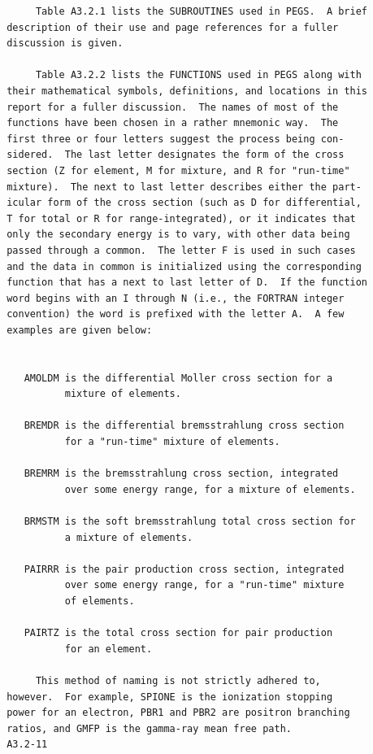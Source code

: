 \newpage {} \begin{verbatim}
      Table A3.2.1 lists the SUBROUTINES used in PEGS.  A brief
 description of their use and page references for a fuller
 discussion is given.
 
      Table A3.2.2 lists the FUNCTIONS used in PEGS along with
 their mathematical symbols, definitions, and locations in this
 report for a fuller discussion.  The names of most of the
 functions have been chosen in a rather mnemonic way.  The
 first three or four letters suggest the process being con-
 sidered.  The last letter designates the form of the cross
 section (Z for element, M for mixture, and R for "run-time"
 mixture).  The next to last letter describes either the part-
 icular form of the cross section (such as D for differential,
 T for total or R for range-integrated), or it indicates that
 only the secondary energy is to vary, with other data being
 passed through a common.  The letter F is used in such cases
 and the data in common is initialized using the corresponding
 function that has a next to last letter of D.  If the function
 word begins with an I through N (i.e., the FORTRAN integer
 convention) the word is prefixed with the letter A.  A few
 examples are given below:
 
 
    AMOLDM is the differential Moller cross section for a
           mixture of elements.
 
    BREMDR is the differential bremsstrahlung cross section
           for a "run-time" mixture of elements.
 
    BREMRM is the bremsstrahlung cross section, integrated
           over some energy range, for a mixture of elements.
 
    BRMSTM is the soft bremsstrahlung total cross section for
           a mixture of elements.
 
    PAIRRR is the pair production cross section, integrated
           over some energy range, for a "run-time" mixture
           of elements.
 
    PAIRTZ is the total cross section for pair production
           for an element.
 
      This method of naming is not strictly adhered to,
 however.  For example, SPIONE is the ionization stopping
 power for an electron, PBR1 and PBR2 are positron branching
 ratios, and GMFP is the gamma-ray mean free path.
 A3.2-11
\end{verbatim} 
